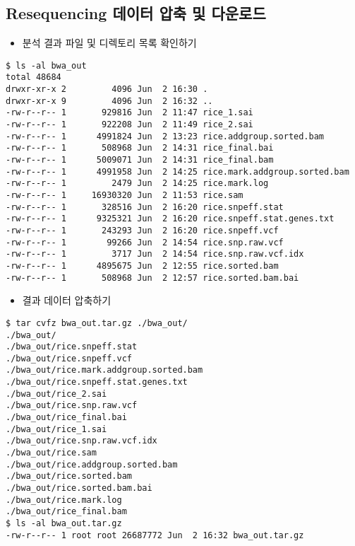 \documentclass{article}
\begin{document}
\subsection{Resequencing 데이터 압축 및 다운로드}

\begin{itemize}
\item
  \begin{itemize}
  분석 결과 파일 및 디렉토리 목록 확인하기  
  \end{itemize}
\end{itemize}
\begin{lstlisting}[frame=single,style=Bash,xleftmargin=1.4cm,xrightmargin=1.4cm]
$ ls -al bwa_out
total 48684
drwxr-xr-x 2         4096 Jun  2 16:30 .
drwxr-xr-x 9         4096 Jun  2 16:32 ..
-rw-r--r-- 1       929816 Jun  2 11:47 rice_1.sai
-rw-r--r-- 1       922208 Jun  2 11:49 rice_2.sai
-rw-r--r-- 1      4991824 Jun  2 13:23 rice.addgroup.sorted.bam
-rw-r--r-- 1       508968 Jun  2 14:31 rice_final.bai
-rw-r--r-- 1      5009071 Jun  2 14:31 rice_final.bam
-rw-r--r-- 1      4991958 Jun  2 14:25 rice.mark.addgroup.sorted.bam
-rw-r--r-- 1         2479 Jun  2 14:25 rice.mark.log
-rw-r--r-- 1     16930320 Jun  2 11:53 rice.sam
-rw-r--r-- 1       328516 Jun  2 16:20 rice.snpeff.stat
-rw-r--r-- 1      9325321 Jun  2 16:20 rice.snpeff.stat.genes.txt
-rw-r--r-- 1       243293 Jun  2 16:20 rice.snpeff.vcf
-rw-r--r-- 1        99266 Jun  2 14:54 rice.snp.raw.vcf
-rw-r--r-- 1         3717 Jun  2 14:54 rice.snp.raw.vcf.idx
-rw-r--r-- 1      4895675 Jun  2 12:55 rice.sorted.bam
-rw-r--r-- 1       508968 Jun  2 12:57 rice.sorted.bam.bai
\end{lstlisting}

\begin{itemize}
\item
  \begin{itemize}
  결과 데이터 압축하기  
  \end{itemize}
\end{itemize}
\begin{lstlisting}[frame=single,style=Bash,xleftmargin=1.4cm,xrightmargin=1.4cm]
$ tar cvfz bwa_out.tar.gz ./bwa_out/
./bwa_out/
./bwa_out/rice.snpeff.stat
./bwa_out/rice.snpeff.vcf
./bwa_out/rice.mark.addgroup.sorted.bam
./bwa_out/rice.snpeff.stat.genes.txt
./bwa_out/rice_2.sai
./bwa_out/rice.snp.raw.vcf
./bwa_out/rice_final.bai
./bwa_out/rice_1.sai
./bwa_out/rice.snp.raw.vcf.idx
./bwa_out/rice.sam
./bwa_out/rice.addgroup.sorted.bam
./bwa_out/rice.sorted.bam
./bwa_out/rice.sorted.bam.bai
./bwa_out/rice.mark.log
./bwa_out/rice_final.bam
$ ls -al bwa_out.tar.gz 
-rw-r--r-- 1 root root 26687772 Jun  2 16:32 bwa_out.tar.gz
\end{lstlisting}
\end{document}
